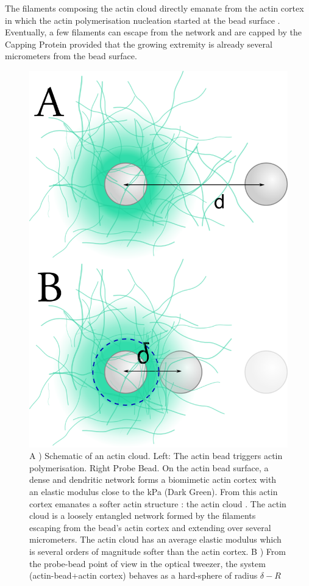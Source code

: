 \documentclass[A4paperpaper,11pt,english]{sphinxmanual}
\begin{document}
The filaments composing the actin cloud directly emanate from the actin
cortex in which the actin polymerisation nucleation started at the bead surface
. Eventually, a few filaments can escape from the network and are
capped by the Capping Protein provided that the growing extremity is already several
micrometers from the bead surface.
\begin{figure}[htbp]
\centering
\capstart

\includegraphics[width=0.900\linewidth]{interp-delta.png}
\caption{A ) Schematic of an actin cloud. Left:  The actin bead triggers actin
polymerisation. Right Probe Bead. On the actin bead surface, a dense
and dendritic network forms a biomimetic actin cortex with an elastic
modulus close to the kPa (Dark Green). From this actin cortex emanates a
softer actin structure : the actin cloud . The actin cloud is a loosely
entangled network formed by the filaments escaping from the bead's actin
cortex and extending over several micrometers. The actin cloud has an average
elastic modulus which is several orders of magnitude softer than the actin
cortex. B ) From the probe-bead point of view in the optical tweezer, the
system (actin-bead+actin cortex) behaves as a hard-sphere of radius
\(\delta-R\)}\label{index-latex:fig-interpretation}\end{figure}
\end{document}
